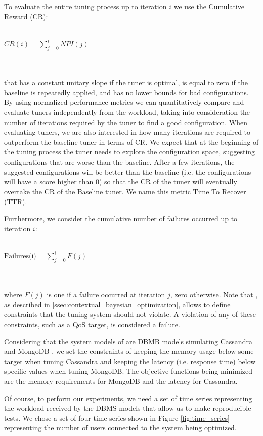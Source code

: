 \documentclass[a4paper, 12pt]{article} %
\begin{document}
	To evaluate the entire tuning process up to iteration $i$ we use the Cumulative Reward (CR):\\\\
	\centerline{
		$
		CR(i) = \sum_{j=0}^{i} NPI(j)
		$
	}\\\\
	that has a constant unitary slope if the tuner is optimal, is equal to zero if the baseline is repeatedly applied, and has no lower bounds for bad configurations.\\
	By using normalized performance metrics we can quantitatively compare and evaluate tuners independently from the workload, taking into consideration the number of iterations required by the tuner to find a good configuration. When evaluating tuners, we are also interested in how many iterations are required to outperform the baseline tuner in terms of CR. We expect that at the beginning of the tuning process the tuner needs to explore the configuration space, suggesting configurations that are worse than the baseline. After a few iterations, the suggested configurations will be better than the baseline (i.e. the configurations will have a score higher than 0) so that the CR of the tuner will eventually overtake the CR of the Baseline tuner. We name this metric Time To Recover (TTR).
	
	Furthermore, we consider the cumulative number of failures occurred up to iteration $i$:\\\\
	\centerline{
		$
		\text{Failures(i)} = \sum_{j=0}^{i} F(j)
		$
	}\\\\
	where $F(j)$ is one if a failure occurred at iteration $j$, zero otherwise. Note that \cite{AkamasCGP}, as described in \ref{ssec:contextual_bayesian_optimization}, allows to define constraints that the tuning system should not violate. A violation of any of these constraints, such as a QoS target, is considered a failure.
	
	Considering that the system models of \cite{AkamasCGP} are DBMB models simulating Cassandra \cite{Cassandra} and MongoDB \cite{MongoDB}, we set the constraints of keeping the memory usage below some target when tuning Cassandra and keeping the latency (i.e. response time) below specific values when tuning MongoDB.
	The objective functions being minimized are the memory requirements for MongoDB and the latency for Cassandra.
	
	Of course, to perform our experiments, we need a set of time series representing the workload received by the DBMS models that allow us to make reproducible tests. We chose a set of four time series shown in Figure \ref{fig:time_series} representing the number of users connected to the system being optimized.  
	
\end{document}
